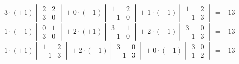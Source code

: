 \begin{exercises}
\begin{answer}
      \begin{exparts}
         \partsitem \( 3\cdot(+1)\begin{vmatrix}
                          2  &2  \\
                          3  &0
                       \end{vmatrix}
                 +0\cdot (-1)\begin{vmatrix}
                          1  &2  \\
                         -1  &0
                       \end{vmatrix}
                 +1\cdot (+1)\begin{vmatrix}
                          1  &2  \\
                         -1  &3
                       \end{vmatrix} =-13 \)
         \partsitem \( 1\cdot (-1)\begin{vmatrix}
                          0  &1  \\
                          3  &0
                       \end{vmatrix}
                 +2\cdot (+1)\begin{vmatrix}
                          3  &1  \\
                         -1  &0
                       \end{vmatrix}
                 +2\cdot (-1)\begin{vmatrix}
                          3  &0  \\
                         -1  &3
                       \end{vmatrix} =-13 \)
         \partsitem \( 1\cdot (+1)\begin{vmatrix}
                          1  &2  \\
                         -1  &3
                       \end{vmatrix}
                 +2\cdot (-1)\begin{vmatrix}
                          3  &0  \\
                         -1  &3
                       \end{vmatrix}
                 +0\cdot (+1)\begin{vmatrix}
                          3  &0  \\
                          1  &2
                       \end{vmatrix} =-13 \)
       \end{exparts}  
     \end{answer}

\end{exercises}
